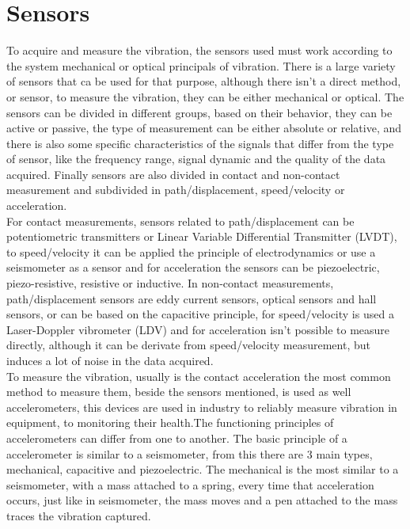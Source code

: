 \section{Sensors}\label{sec:VibSens}
To acquire and measure the vibration, the sensors used must work according to the system mechanical or optical principals of vibration. There is a large variety of sensors that ca be used for that purpose, although there isn't a direct method, or sensor, to measure the vibration, they can be either mechanical or optical. The sensors can be divided in different groups, based on their behavior, they can be active or passive, the type of measurement can be either absolute or relative, and there is also some specific characteristics of the signals that differ from the type of sensor, like the frequency range, signal dynamic and the quality of the data acquired. Finally sensors are also divided in contact and non-contact measurement and subdivided in path/displacement, speed/velocity or acceleration.\\
For contact measurements, sensors related to path/displacement can be potentiometric transmitters or Linear Variable Differential Transmitter (LVDT), to speed/velocity it can be applied the principle of electrodynamics or use a seismometer as a sensor and for acceleration the sensors can be piezoelectric, piezo-resistive, resistive or inductive. In non-contact measurements, path/displacement sensors are eddy current sensors, optical sensors and hall sensors, or can be based on the capacitive principle, for speed/velocity is used a Laser-Doppler vibrometer (LDV) and for acceleration isn't possible to measure directly, although it can be derivate from speed/velocity measurement, but induces a lot of noise in the data acquired\cite{SensorsVibrationMeasurement}\cite{VibrationMeasurementVibration2019}.\\
To measure the vibration, usually is the contact acceleration the most common method to measure them, beside the sensors mentioned, is used as well accelerometers, this devices are used in industry to reliably measure vibration in equipment, to monitoring their health.The functioning  principles of accelerometers can differ from one to another. The basic principle of a accelerometer is similar to a seismometer, from this there are 3 main types, mechanical, capacitive and piezoelectric. The mechanical is the most similar to a seismometer, with a mass attached to a spring, every time that acceleration occurs, just like in seismometer, the mass moves and a pen attached to the mass traces the vibration captured.
